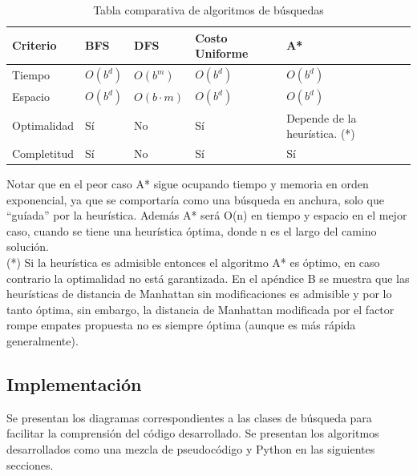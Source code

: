 \documentclass[letter, titlepage, 10pt]{article}
\begin{document}
\begin{table}[H]
\begin{center}

\begin{tabular}{|l|l|l|l|l|}
\hline
\textbf{Criterio} & \textbf{BFS}           & \textbf{DFS}           & \textbf{Costo Uniforme} & \textbf{A*}               \\ \hline
Tiempo            & $O(b^d)$ & $O(b^m)$ & $O(b^d)$  & $O(b^d)$    \\ \hline
Espacio           & $O(b^d)$ & $O(b\cdot m)$            & $O(b^d)$  & $O(b^d)$    \\ \hline
Optimalidad       & Sí                     & No                     & Sí                      & Depende de la heurística. {\small(*)} \\ \hline
Completitud       & Sí                     & No                     & Sí                      & Sí                        \\ \hline
\end{tabular}
\caption{Tabla comparativa de algoritmos de búsquedas}
\end{center}

\end{table}

Notar que en el peor caso A* sigue ocupando tiempo y memoria en orden exponencial, ya que se comportaría como una búsqueda en anchura, solo que ``guíada'' por la heurística. 
Además A* será O(n) en tiempo y espacio en el mejor caso, cuando se tiene una heurística óptima, donde n es el largo del camino solución.\\

{\small(*)} Si la heurística es admisible entonces el algoritmo A* es óptimo, en caso contrario la optimalidad no está garantizada. En el apéndice B se muestra que las heurísticas de distancia de Manhattan sin modificaciones es admisible y por lo tanto óptima, sin embargo, la distancia de Manhattan modificada por el factor rompe empates propuesta no es siempre óptima (aunque es más rápida generalmente).

\newpage
\subsection{Implementación}
Se presentan los diagramas correspondientes a las clases de búsqueda para facilitar la comprensión del código desarrollado. Se presentan los algoritmos desarrollados como una mezcla de pseudocódigo y Python en las siguientes secciones.
\end{document}
